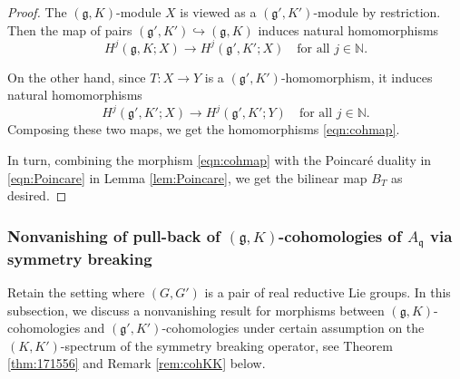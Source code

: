 \begin{proof}
The $({\mathfrak{g}}, K)$-module $X$ is viewed 
 as a $({\mathfrak{g}}', K')$-module
 by restriction.  
Then the map of pairs 
$
   ({\mathfrak{g}}', K') \hookrightarrow ({\mathfrak{g}}, K)
$
 induces natural homomorphisms
\[
   H^j({\mathfrak{g}}, K; X) \to H^j({\mathfrak{g}}', K'; X)
\quad
\text{for all $j \in {\mathbb{N}}$.}
\]



On the other hand,
 since $T \colon X \to Y$ is a $({\mathfrak{g}}', K')$-homomorphism,
 it induces natural homomorphisms
\[
   H^j({\mathfrak{g}}', K'; X) \to H^j({\mathfrak{g}}', K'; Y)
\quad
\text{for all $j \in {\mathbb{N}}$.}
\]
Composing these two maps,
 we get the homomorphisms
 \eqref{eqn:cohmap}.  



In turn, 
 combining the morphism \eqref{eqn:cohmap}
 with 
 the Poincar{\'e} duality in \eqref{eqn:Poincare}
 in Lemma \ref{lem:Poincare}, 
 we get the bilinear map $B_T$
 as desired.  
\end{proof}



\subsubsection{Nonvanishing of pull-back of $({\mathfrak{g}}, K)$-cohomologies
 of $A_{{\mathfrak{q}}}$ via symmetry breaking}

Retain the setting where $(G,G')$ is a pair of real reductive Lie groups.  
In this subsection, 
 we discuss a nonvanishing result 
 for morphisms between $({\mathfrak{g}}, K)$-cohomologies
 and $({\mathfrak{g}}', K')$-cohomologies
 under certain assumption 
 on the 
$(K,K')$-spectrum
 of the symmetry breaking operator,
 see Theorem \ref{thm:171556} and Remark \ref{rem:cohKK} below.  



